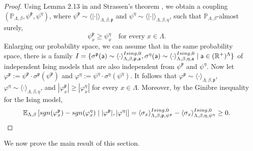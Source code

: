 \documentclass[11pt,a4paper]{article}
\theoremstyle{definition}
\numberwithin{equation}{section}
\begin{document}
\begin{proof}
Using Lemma 2.13 in \cite{GunaratnamPanagiotisPanisSeveroPhi42022} and Strassen's theorem \cite{Strassen1965}, we obtain a coupling $(\mathbb{P}_{\Lambda,\beta},\psi^\mathfrak{p},\psi^{\eta})$, where $\psi^\mathfrak{p}\sim \langle |\cdot |\rangle_{\Lambda,\beta,\mathfrak{p}}$ and $\psi^{\eta}\sim \langle |\cdot |\rangle_{\Lambda,\beta,\eta}$, such that $\mathbb{P}_{\Lambda,\beta}$-almost surely, 
\begin{equation}
    \psi^\mathfrak{p}_x\geq \psi^{\eta}_x \quad \text{for every } x\in \Lambda.
\end{equation}
Enlarging our probability space, we can assume that in the same probability space, there is a family $I=\{\sigma^\mathfrak{p}(\mathsf{a}) \sim \langle \cdot \rangle^{\textup{Ising},0}_{\Lambda,\beta,\mathfrak{p},\mathsf{a}}, \sigma^{\eta}(\mathsf{a}) \sim \langle \cdot \rangle^{\textup{Ising},0}_{\Lambda,\beta,\eta,\mathsf{a}}  \mid \mathsf{a}\in (\mathbb{R}^+)^{\Lambda}\}$ of independent Ising models that are also independent from $\psi^\mathfrak{p}$ and $\psi^{\eta}$. Now let $\varphi^\mathfrak{p}:=\psi^\mathfrak{p} \cdot \sigma^\mathfrak{p}(\psi^\mathfrak{p})$ and $\varphi^\eta:=\psi^\eta \cdot\sigma^\eta(\psi^\eta)$. It follows that $\varphi^\mathfrak{p}\sim \langle \cdot \rangle_{\Lambda,\beta,\mathfrak{p}}$, $\varphi^{\eta}\sim \langle \cdot \rangle_{\Lambda,\beta,\eta}$, and $|\varphi^\mathfrak{p}_x|\geq |\varphi^{\eta}_x|$ for every $x\in \Lambda$.
Moreover, by the Ginibre
inequality for the Ising model,
\begin{equation}
\mathbb{E}_{\Lambda,\beta}\left[\textup{sgn}(\varphi^\mathfrak{p}_x) -\textup{sgn}(\varphi^\eta_x)  \mid |\varphi^\mathfrak{p}|,|\varphi^\eta|\right]
=\langle \sigma_x  \rangle^{\textup{Ising},0}_{\Lambda,\beta,\mathfrak{p},\psi^\mathfrak{p}}-\langle \sigma_x \rangle^{\textup{Ising},0}_{\Lambda,\beta,\eta, \psi^\eta} \geq 0.
\end{equation}
\end{proof}

We now prove the main result of this section.
\end{document}
